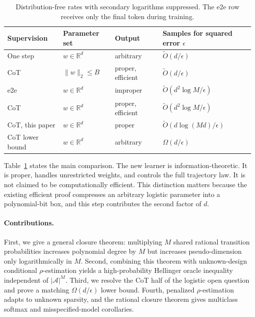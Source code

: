 \documentclass[twoside]{article}
\newcommand{\A}{\mathcal A}
\newcommand{\R}{\mathbb R}
\begin{document}
\begin{table}[t]
\caption{Distribution-free rates with secondary logarithms suppressed. The e2e row receives only the final token during training.}
\label{tab:rates}
\centering
\small \setlength{\tabcolsep}{9pt}
\begin{tabular}{llll}
\toprule
Supervision & Parameter set & Output & Samples for squared error $\epsilon$ \\
\midrule
One step & $w\in\R^d$ & arbitrary & $\widetilde O(d/\epsilon)$ \\
CoT \citep{foster2024} & $\|w\|_2\leq B$ & proper, efficient & $\widetilde O(d/\epsilon)$ \\
e2e \citep{doron2026stochastic} & $w\in\R^d$ & improper & $\widetilde O(d^2\log M/\epsilon)$ \\
CoT \citep{doron2026stochastic} & $w\in\R^d$ & proper, efficient & $\widetilde O(d^2\log M/\epsilon)$ \\
CoT, this paper & $w\in\R^d$ & proper & $\widetilde O(d\log(Md)/\epsilon)$ \\
CoT lower bound & $w\in\R^d$ & arbitrary & $\Omega(d/\epsilon)$ \\
\bottomrule
\end{tabular}
\end{table}

Table~\ref{tab:rates} states the main comparison. The new learner is information-theoretic. It is proper, handles unrestricted weights, and controls the full trajectory law. It is not claimed to be computationally efficient. This distinction matters because the existing efficient proof compresses an arbitrary logistic parameter into a polynomial-bit box, and this step contributes the second factor of $d$.

\paragraph{Contributions.} First, we give a general closure theorem: multiplying $M$ shared rational transition probabilities increases polynomial degree by $M$ but increases pseudo-dimension only logarithmically in $M$. Second, combining this theorem with unknown-design conditional $\rho$-estimation yields a high-probability Hellinger oracle inequality independent of $|\A|^M$. Third, we resolve the CoT half of the logistic open question and prove a matching $\Omega(d/\epsilon)$ lower bound. Fourth, penalized $\rho$-estimation adapts to unknown sparsity, and the rational closure theorem gives multiclass softmax and misspecified-model corollaries.
\end{document}
